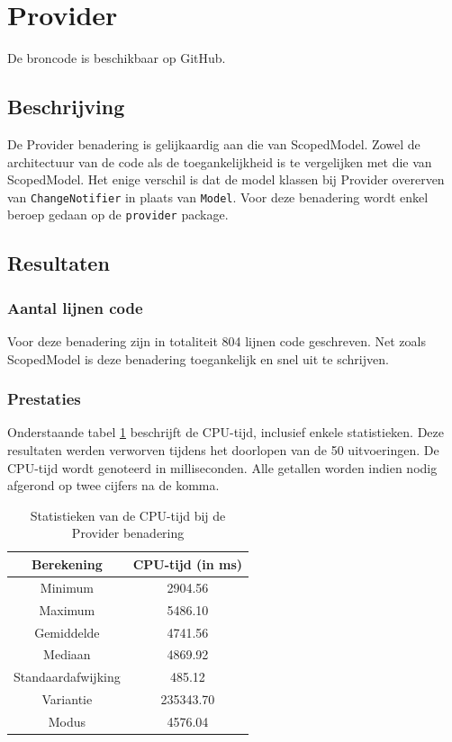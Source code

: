 \section{Provider}
De broncode is beschikbaar op GitHub. \autocite{DeVrient2019b}
\subsection{Beschrijving}
De Provider benadering is gelijkaardig aan die van ScopedModel. Zowel de architectuur van de code als de toegankelijkheid is te vergelijken met die van ScopedModel. Het enige verschil is dat de model klassen bij Provider overerven van \verb|ChangeNotifier| in plaats van \verb|Model|. \newline \newline
Voor deze benadering wordt enkel beroep gedaan op de \verb|provider| package. 

\subsection{Resultaten}
\subsubsection{Aantal lijnen code}
Voor deze benadering zijn in totaliteit 804 lijnen code geschreven. Net zoals ScopedModel is deze benadering toegankelijk en snel uit te schrijven.

\subsubsection{Prestaties}
Onderstaande tabel \ref{table:experiment-provider-statistics} beschrijft de CPU-tijd, inclusief enkele statistieken. Deze resultaten werden verworven tijdens het doorlopen van de 50 uitvoeringen. De CPU-tijd wordt genoteerd in milliseconden. Alle getallen worden indien nodig afgerond op twee cijfers na de komma.
\begin{table}[H]
    \centering
    \begin{tabular}{c|c}
        \textbf{Berekening} & \textbf{CPU-tijd (in ms)}  \\ \hline
        Minimum             & 2904.56                    \\ \hline
        Maximum             & 5486.10                    \\ \hline
        Gemiddelde          & 4741.56                    \\ \hline
        Mediaan             & 4869.92                    \\ \hline
        Standaardafwijking  & 485.12                     \\ \hline
        Variantie           & 235343.70                  \\ \hline
        Modus               & 4576.04                      \\                
    \end{tabular}
    \caption{Statistieken van de CPU-tijd bij de Provider benadering}
    \label{table:experiment-provider-statistics}
\end{table}

